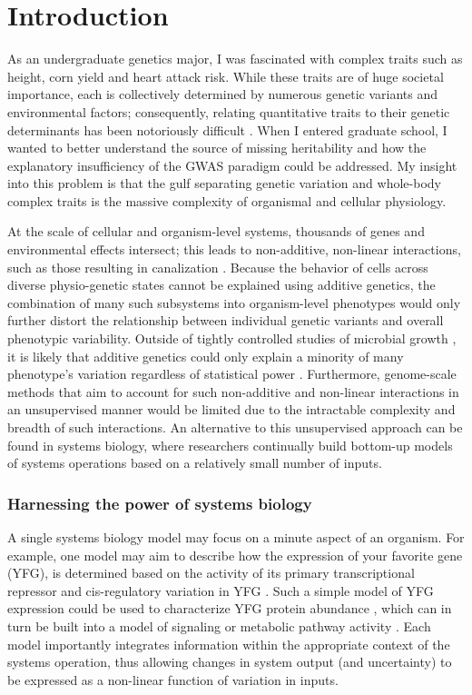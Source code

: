 
\chapter{Introduction\label{ch:intro}}

As an undergraduate genetics major, I was fascinated with complex traits such as height, corn yield and heart attack risk. While these traits are of huge societal importance, each is collectively determined by numerous genetic variants and environmental factors; consequently, relating quantitative traits to their genetic determinants has been notoriously difficult \cite{Manolio:2009jp}. When I entered graduate school, I wanted to better understand the source of missing heritability and how the explanatory insufficiency of the GWAS paradigm could be addressed. My insight into this problem is that the gulf separating genetic variation and whole-body complex traits is the massive complexity of organismal and cellular physiology.

At the scale of cellular and organism-level systems, thousands of genes and environmental effects intersect; this leads to non-additive, non-linear interactions, such as those resulting in canalization \cite{Waddington:1942wy}. Because the behavior of cells across diverse physio-genetic states cannot be explained using additive genetics, the combination of many such subsystems into organism-level phenotypes would only further distort the relationship between individual genetic variants and overall phenotypic variability. Outside of tightly controlled studies of microbial growth \cite{Bloom:2013bq}, it is likely that additive genetics could only explain a minority of many phenotype's variation regardless of statistical power \cite{Weedon:2008gc,WellcomeTrustCaseControlConsortium:2007do}. Furthermore, genome-scale methods that aim to account for such non-additive and non-linear interactions in an unsupervised manner would be limited due to the intractable complexity and breadth of such interactions. An alternative to this unsupervised approach can be found in systems biology, where researchers continually build bottom-up models of systems operations based on a relatively small number of inputs.

\subsection{Harnessing the power of systems biology}

A single systems biology model may focus on a minute aspect of an organism. For example, one model may aim to describe how the expression of your favorite gene (YFG), is determined based on the activity of its primary transcriptional repressor and cis-regulatory variation in YFG \cite{Nuzhdin:2012ii}. Such a simple model of YFG expression could be used to characterize YFG protein abundance \cite{Jovanovic:2015hp}, which can in turn be built into a model of signaling or metabolic pathway activity \cite{Neves:2002bk, Chassagnole:2002ty}.  Each model importantly integrates information within the appropriate context of the systems operation, thus allowing changes in system output (and uncertainty) to be expressed as a non-linear function of variation in inputs.


